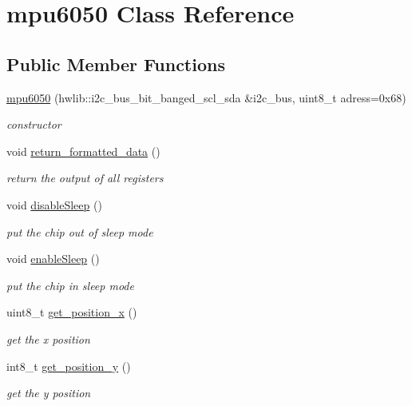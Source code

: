 \hypertarget{classmpu6050}{}\section{mpu6050 Class Reference}
\label{classmpu6050}
\subsection*{Public Member Functions}
\begin{DoxyCompactItemize}
\item 
\hyperlink{classmpu6050_a1938b793c68db02885ef121b0718db54}{mpu6050} (hwlib\+::i2c\+\_\+bus\+\_\+bit\+\_\+banged\+\_\+scl\+\_\+sda \&i2c\+\_\+bus, uint8\+\_\+t adress=0x68)
\begin{DoxyCompactList}\small\item\em constructor \end{DoxyCompactList}\item 
void \hyperlink{classmpu6050_aef4c4ff834f62b2a57342fa6c761f701}{return\+\_\+formatted\+\_\+data} ()
\begin{DoxyCompactList}\small\item\em return the output of all registers \end{DoxyCompactList}\item 
void \hyperlink{classmpu6050_af945ffe99c421c67cd4e4134a37f99d2}{disable\+Sleep} ()
\begin{DoxyCompactList}\small\item\em put the chip out of sleep mode \end{DoxyCompactList}\item 
void \hyperlink{classmpu6050_a766d1a6a4d9af1dc47a21ae91b1ee289}{enable\+Sleep} ()
\begin{DoxyCompactList}\small\item\em put the chip in sleep mode \end{DoxyCompactList}\item 
uint8\+\_\+t \hyperlink{classmpu6050_a2de2ed1159eb80c0fc3d0a273b7e058c}{get\+\_\+position\+\_\+x} ()
\begin{DoxyCompactList}\small\item\em get the x position \end{DoxyCompactList}\item 
int8\+\_\+t \hyperlink{classmpu6050_ac11bddbc6795e1c36b1f89b743ce63ec}{get\+\_\+position\+\_\+y} ()
\begin{DoxyCompactList}\small\item\em get the y position \end{DoxyCompactList}\item 

\end{DoxyCompactItemize}
